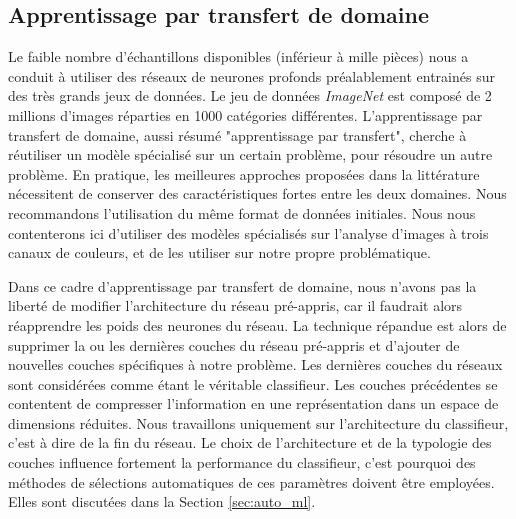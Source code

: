 \subsection{Apprentissage par transfert de domaine} \label{subsec:transfer_learning}

Le faible nombre d'échantillons disponibles (inférieur à mille pièces) nous a conduit à utiliser des réseaux de neurones profonds préalablement entrainés sur des très grands jeux de données.
Le jeu de données \textit{ImageNet} \cite{deng_imagenet_2009} est composé de 2 millions d'images réparties en 1000 catégories différentes.
L'apprentissage par transfert de domaine, aussi résumé "apprentissage par transfert", cherche à réutiliser un modèle spécialisé sur un certain problème, pour résoudre un autre problème.
En pratique, les meilleures approches proposées dans la littérature nécessitent de conserver des caractéristiques fortes entre les deux domaines.
Nous recommandons l'utilisation du même format de données initiales.
Nous nous contenterons ici d'utiliser des modèles spécialisés sur l'analyse d'images à trois canaux de couleurs, et de les utiliser sur notre propre problématique.

Dans ce cadre d'apprentissage par transfert de domaine, nous n'avons pas la liberté de modifier l'architecture du réseau pré-appris, car il faudrait alors réapprendre les poids des neurones du réseau.
La technique répandue est alors de supprimer la ou les dernières couches du réseau pré-appris et d'ajouter de nouvelles couches spécifiques à notre problème.
Les dernières couches du réseaux sont considérées comme étant le véritable classifieur.
Les couches précédentes se contentent de compresser l'information en une représentation dans un espace de dimensions réduites.
Nous travaillons uniquement sur l'architecture du classifieur, c'est à dire de la fin du réseau.
Le choix de l'architecture et de la typologie des couches influence fortement la performance du classifieur, c'est pourquoi des méthodes de sélections automatiques de ces paramètres doivent être employées.
Elles sont discutées dans la Section \ref{sec:auto_ml}.

